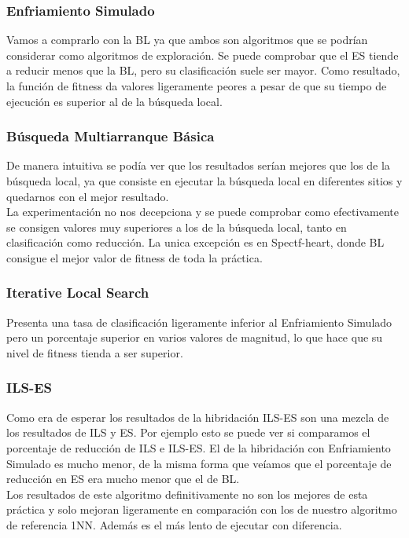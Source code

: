 \documentclass[12pt, spanish]{article}
\begin{document}
\subsubsection{Enfriamiento Simulado}
Vamos a comprarlo con la BL ya que ambos son algoritmos que se podrían considerar como algoritmos de exploración. Se puede comprobar que el ES tiende a reducir menos que la BL, pero su clasificación suele ser mayor. Como resultado, la función de fitness da valores ligeramente peores a pesar de que su tiempo de ejecución es superior al de la búsqueda local.

\subsubsection{Búsqueda Multiarranque Básica}
De manera intuitiva se podía ver que los resultados serían mejores que los de la búsqueda local, ya que consiste en ejecutar la búsqueda local en diferentes sitios y quedarnos con el mejor resultado. \\
La experimentación no nos decepciona y se puede comprobar como efectivamente se consigen valores muy superiores a los de la búsqueda local, tanto en clasificación como reducción. La unica excepción es en Spectf-heart, donde BL consigue el mejor valor de fitness de toda la práctica. 

\subsubsection{Iterative Local Search}
Presenta una tasa de clasificación ligeramente inferior al Enfriamiento Simulado pero un porcentaje superior en varios valores de magnitud, lo que hace que su nivel de fitness tienda a ser superior. 

\subsubsection{ILS-ES}
Como era de esperar los resultados de la hibridación ILS-ES son una mezcla de los resultados de ILS y ES. Por ejemplo esto se puede ver si comparamos el porcentaje de reducción de ILS e ILS-ES. El de la hibridación con Enfriamiento Simulado es mucho menor, de la misma forma que veíamos que el porcentaje de reducción en ES era mucho menor que el de BL. \\
\newline
Los resultados de este algoritmo definitivamente no son los mejores de esta práctica y solo mejoran ligeramente en comparación con los de nuestro algoritmo de referencia 1NN. Además es el más lento de ejecutar con diferencia. 
\end{document}
